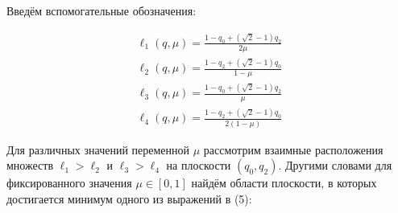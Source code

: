 \begin{flushleft}
	Введём вспомогательные обозначения:
	
	\begin{gather*}
		\ell_1(q,\mu)=\frac{1-q_0+(\sqrt{2}-1)q_2}{2\mu} \\
		\ell_2(q,\mu)=\frac{1-q_2+(\sqrt{2}-1)q_0}{1-\mu} \\
		\ell_3(q,\mu)=\frac{1-q_0+(\sqrt{2}-1)q_2}{\mu} \\
		\ell_4(q,\mu)=\frac{1-q_2+(\sqrt{2}-1)q_0}{2(1-\mu)}
	\end{gather*}
	
	
	Для различных значений переменной $\mu$ рассмотрим 
	взаимные расположения множеств $\ell_1>\ell_2$ и $\ell_3>\ell_4$
	на плоскости $(q_0,q_2)$. Другими словами для фиксированного 
	значения $\mu \in [0,1]$ найдём области плоскости, в которых 
	достигается минимум одного из выражений в (5):
	

\end{flushleft}
